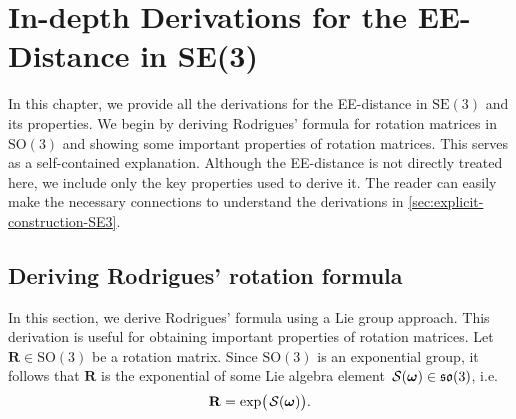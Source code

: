 \chapter{In-depth Derivations for the EE-Distance in SE(3)}\label{app:rodrigues-formula}
In this chapter, we provide all the derivations for the EE-distance in $\text{SE}(3)$ and its properties. We begin by deriving Rodrigues' formula for rotation matrices in $\text{SO}(3)$ and showing some important properties of rotation matrices. This serves as a self-contained explanation. Although the EE-distance is not directly treated here, we include only the key properties used to derive it. The reader can easily make the necessary connections to understand the derivations in \cref{sec:explicit-construction-SE3}.
\section{Deriving Rodrigues' rotation formula}
In this section, we derive Rodrigues' formula using a Lie group approach. This derivation is useful for obtaining important properties of rotation matrices. Let $\mathbf{R}\in\text{SO}(3)$ be a rotation matrix. Since $\text{SO}(3)$ is an exponential group, it follows that $\mathbf{R}$ is the exponential of some Lie algebra element $\SL[\boldsymbol{\omega}]\in\mathfrak{so}(3)$, i.e.
\begin{align}
    \mathbf{R} = \exp\bigl(\SL[\boldsymbol{\omega}]\bigr).
\end{align}


